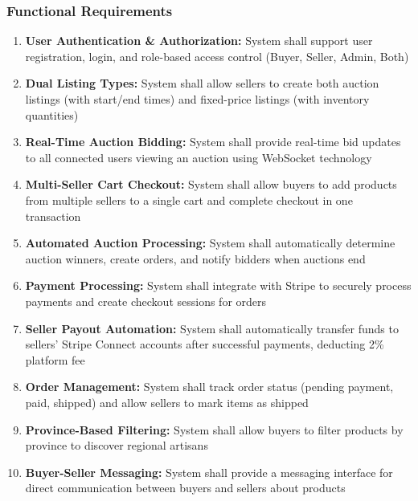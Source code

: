\documentclass[12pt,a4paper]{article}
\begin{document}
\subsubsection{Functional Requirements}
\begin{enumerate}[leftmargin=*]
    \item \textbf{User Authentication \& Authorization:} System shall support user registration, login, and role-based access control (Buyer, Seller, Admin, Both)
    
    \item \textbf{Dual Listing Types:} System shall allow sellers to create both auction listings (with start/end times) and fixed-price listings (with inventory quantities)
    
    \item \textbf{Real-Time Auction Bidding:} System shall provide real-time bid updates to all connected users viewing an auction using WebSocket technology
    
    \item \textbf{Multi-Seller Cart Checkout:} System shall allow buyers to add products from multiple sellers to a single cart and complete checkout in one transaction
    
    \item \textbf{Automated Auction Processing:} System shall automatically determine auction winners, create orders, and notify bidders when auctions end
    
    \item \textbf{Payment Processing:} System shall integrate with Stripe to securely process payments and create checkout sessions for orders
    
    \item \textbf{Seller Payout Automation:} System shall automatically transfer funds to sellers' Stripe Connect accounts after successful payments, deducting 2\% platform fee
    
    \item \textbf{Order Management:} System shall track order status (pending payment, paid, shipped) and allow sellers to mark items as shipped
    
    \item \textbf{Province-Based Filtering:} System shall allow buyers to filter products by province to discover regional artisans
    
    \item \textbf{Buyer-Seller Messaging:} System shall provide a messaging interface for direct communication between buyers and sellers about products
    

\end{enumerate}
\end{document}
